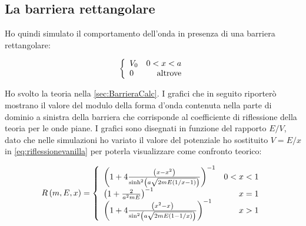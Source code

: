\subsection{La barriera rettangolare}
Ho quindi simulato il comportamento dell'onda in presenza di una barriera rettangolare:

\begin{equation}\label{eq:Barriera}
  \lr\{.{\begin{array}{lr}
      V_0& 0<x<a\\
      0&\text{altrove}
  \end{array}}
\end{equation}

Ho svolto la teoria nella \autoref{sec:BarrieraCalc}.
I grafici che in seguito riporter\`o mostrano il valore del modulo della forma d'onda contenuta nella parte di dominio a sinistra della barriera che corrisponde al coefficiente di riflessione della teoria per le onde piane. I grafici sono disegnati in funzione del rapporto $ E/V$, dato che nelle simulazioni ho variato il valore del potenziale ho sostituito $V = E/x$ in \eqref{eq:riflessionevanilla} per poterla visualizzare come confronto teorico:

\begin{equation}
R\lrt{m,E,x} = \lr\{.{\begin{array}{lr}
	\lrt{1+4 \frac{\lrt{x-x^2}}{\sinh^2\lrt{a \sqrt{2m E\lrt{1/x-1}}}}}^{-1} & 0<x<1 \\
	\lrt{1+\frac{2}{ a^2 m E}}^{-1}                                             & x=1 \\
	\lrt{1+4 \frac{\lrt{x^2 - x}}{\sin^2\lrt{a \sqrt{2m E\lrt{1-1/x}}}}}^{-1} & x>1
	\end{array}}
\end{equation}



